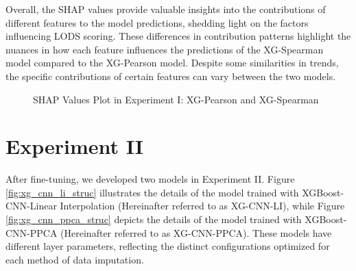 \documentclass[12pt,a4paper,english
]{tunithesis}
\begin{document}
Overall, the SHAP values provide valuable insights into the contributions of different features to the model predictions, shedding light on the factors influencing LODS scoring. These differences in contribution patterns highlight the nuances in how each feature influences the predictions of the XG-Spearman model compared to the XG-Pearson model. Despite some similarities in trends, the specific contributions of certain features can vary between the two models.


\begin{figure}
  \begin{center}
    \qquad                        
    \caption[SHAP values in Experiment I]{SHAP Values Plot in Experiment I: XG-Pearson and XG-Spearman}    
    \label{fig:experiment_1_shap}
  \end{center}
\end{figure}


\section{Experiment II}

After fine-tuning, we developed two models in Experiment II. Figure \ref{fig:xg_cnn_li_struc} illustrates the details of the model trained with XGBoost-CNN-Linear Interpolation (Hereinafter referred to as XG-CNN-LI), while Figure \ref{fig:xg_cnn_ppca_struc} depicts the details of the model trained with XGBoost-CNN-PPCA (Hereinafter referred to as XG-CNN-PPCA). These models have different layer parameters, reflecting the distinct configurations optimized for each method of data imputation.
\end{document}
